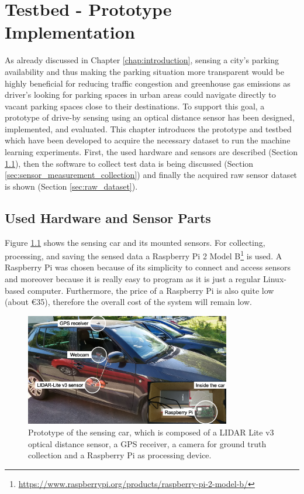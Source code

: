 \chapter{Testbed - Prototype Implementation}
\label{chap:referenceimplementation}

As already discussed in Chapter \ref{chap:introduction}, sensing a city's parking availability and thus making the parking situation more transparent would be highly beneficial for reducing traffic congestion and greenhouse gas emissions as driver's looking for parking spaces in urban areas could navigate directly to vacant parking spaces close to their destinations. To support this goal, a prototype of drive-by sensing using an optical distance sensor has been designed, implemented, and evaluated. This chapter introduces the prototype and testbed which have been developed to acquire the necessary dataset to run the machine learning experiments. First, the used hardware and sensors are described (Section \ref{sec:test_bed}), then the software to collect test data is being discussed (Section \ref{sec:sensor_measurement_collection}) and finally the acquired raw sensor dataset is shown (Section \ref{sec:raw_dataset}).





\section{Used Hardware and Sensor Parts}
\label{sec:test_bed}

Figure \ref{fig:sensing_car} shows the sensing car and its mounted sensors. For collecting, processing, and saving the sensed data a Raspberry Pi 2 Model B\footnote{\url{https://www.raspberrypi.org/products/raspberry-pi-2-model-b/}} is used. A Raspberry Pi was chosen because of its simplicity to connect and access sensors and moreover because it is really easy to program as it is just a regular Linux-based computer. Furthermore, the price of a Raspberry Pi is also quite low (about \euro{35}), therefore the overall cost of the system will remain low.


\begin{figure}
	\centering
	\includegraphics[width=0.8\textwidth]{img/car.jpg}
	\caption{Prototype of the sensing car, which is composed of a LIDAR Lite v3 optical distance sensor, a GPS receiver, a camera for ground truth collection and a Raspberry Pi as processing device.}
	\label{fig:sensing_car}
\end{figure}


